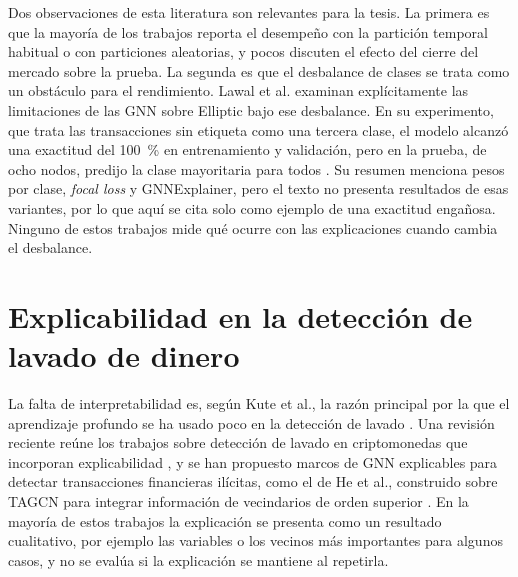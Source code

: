 Dos observaciones de esta literatura son relevantes para la tesis. La primera es que la
mayoría de los trabajos reporta el desempeño con la partición temporal habitual o con
particiones aleatorias, y pocos discuten el efecto del cierre del mercado sobre la prueba. La
segunda es que el desbalance de clases se trata como un obstáculo para el rendimiento. Lawal
et al. examinan explícitamente las limitaciones de las GNN sobre Elliptic bajo ese
desbalance. En su experimento, que trata las transacciones sin etiqueta como una tercera clase,
el modelo alcanzó una exactitud del 100~\% en entrenamiento y validación, pero en la prueba,
de ocho nodos, predijo la clase mayoritaria para todos \cite{Lawal2025Dataset}. Su resumen
menciona pesos por clase, \textit{focal loss} y GNNExplainer, pero el texto no presenta
resultados de esas variantes, por lo que aquí se cita solo como ejemplo de una exactitud
engañosa. Ninguno de estos trabajos mide qué ocurre con las
explicaciones cuando cambia el desbalance.

\section{Explicabilidad en la detección de lavado de dinero}\label{sec:ea_xai_aml}

La falta de interpretabilidad es, según Kute et al., la razón principal por la que el aprendizaje profundo se ha usado poco en la detección de lavado \cite{Kute2021AMLReview}. Una revisión reciente reúne los
trabajos sobre detección de lavado en criptomonedas que incorporan explicabilidad
\cite{Unagar2025Survey}, y se han propuesto marcos de GNN explicables para detectar transacciones financieras ilícitas, como el de He et al., construido sobre TAGCN para integrar información de vecindarios de orden superior \cite{He2026Detection}. En la mayoría de estos trabajos la
explicación se presenta como un resultado cualitativo, por ejemplo las variables o los vecinos
más importantes para algunos casos, y no se evalúa si la explicación se mantiene al repetirla.

